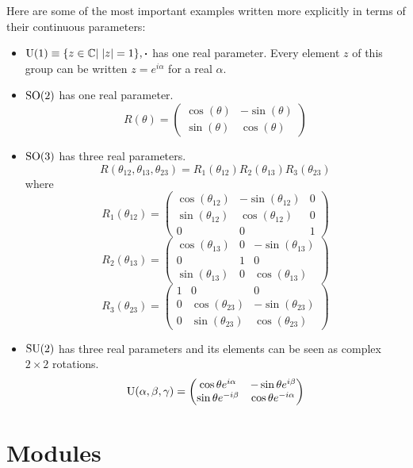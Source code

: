 Here are some of the most important examples written more explicitly in terms of their continuous parameters:
\begin{itemize}
\item $\operatorname{U}(1) \equiv \{z\in\mathbb{C}|\; |z|=1\}, \boldsymbol{\cdot}$ has one real parameter. Every element $z$ of this group can be written $z=e^{i\alpha}$ for a real $\alpha$.
\item $\operatorname{SO}(2)$ has one real parameter.
\[ R(\theta) = \begin{pmatrix}\cos(\theta) & -\sin(\theta)\\ \sin(\theta) & \cos(\theta)\end{pmatrix} \]
\item $\operatorname{SO}(3)$ has three real parameters.
\[ R(\theta_{12},\theta_{13},\theta_{23}) = R_1(\theta_{12})R_2(\theta_{13})R_3(\theta_{23}) \]
where
\[R_1(\theta_{12}) = \begin{pmatrix}\cos(\theta_{12}) & -\sin(\theta_{12})&0\\ \sin(\theta_{12}) & \cos(\theta_{12})&0\\0&0&1\end{pmatrix}\]
\[R_2(\theta_{13}) = \begin{pmatrix}\cos(\theta_{13}) &0& -\sin(\theta_{13})\\0&1&0\\ \sin(\theta_{13}) &0& \cos(\theta_{13})\end{pmatrix}\]
\[R_3(\theta_{23}) = \begin{pmatrix}1&0&0\\ 0&\cos(\theta_{23}) & -\sin(\theta_{23})\\0& \sin(\theta_{23}) & \cos(\theta_{23})\end{pmatrix}\]
\item $\operatorname{SU}(2)$ has three real parameters and its elements can be seen as complex $2\times 2$ rotations.
\[ \operatorname{U}(\alpha, \beta, \gamma) = \begin{pmatrix}\cos\theta e^{i\alpha} & -\sin\theta e^{i\beta}\\ \sin\theta e^{-i\beta} & \cos\theta e^{-i\alpha}\end{pmatrix} \]
\end{itemize}


\chapter{Modules}
